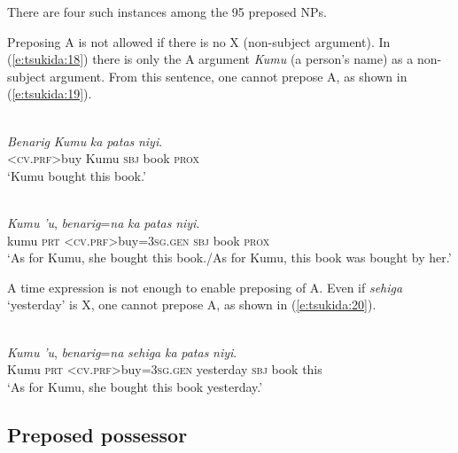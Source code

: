 \documentclass[output=paper
,modfonts
,nonflat]{langsci/langscibook}
\begin{document}
\noindent
There are four such instances among the 95 preposed NPs.

Preposing A is not allowed if there is no X (non-subject argument). In (\ref{e:tsukida:18}) there is only the A argument \textit{Kumu} (a person’s name) as a non-subject argument. From this sentence, one cannot prepose A, as shown in (\ref{e:tsukida:19}).

\begin{exe}
	\label{e:tsukida:18}\\
	\gll \textit{B}{\USSmaller}\textit{en}{\USGreater}\textit{arig} \textit{Kumu} \textit{ka} \textit{patas} \textit{niyi}.\\
	<\textsc{cv.prf}>buy  Kumu  \textsc{sbj} book \textsc{prox} \\
	\glt ‘Kumu bought this book.’
\end{exe}

\begin{exe}
	\label{e:tsukida:19}\\
	\gll {\USStar}\textit{Kumu} \textit{'u},  \textit{b}{\USSmaller}\textit{en}{\USGreater}\textit{arig}=\textit{na} \textit{ka}    \textit{patas}   \textit{niyi}.\\
	\phantom{*}kumu  \textsc{prt} <\textsc{cv.prf}>buy=\textsc{3sg.gen} \textsc{sbj} book \textsc{prox}\\
	\glt ‘As for Kumu, she bought this book./As for Kumu, this book was bought by her.’
\end{exe}

\noindent
A time expression is not enough to enable preposing of A. Even if \textit{sehiga} ‘yesterday’ is X, one cannot prepose A, as shown in (\ref{e:tsukida:20}).

\begin{exe}
	\label{e:tsukida:20}\\
	\gll {\USStar}\textit{Kumu} \textit{'u}, \textit{b}{\USSmaller}\textit{en}{\USGreater}\textit{arig}=\textit{na} \textit{sehiga}  \textit{ka} \textit{patas} \textit{niyi}.\\
	\phantom{*}Kumu  \textsc{prt} <\textsc{cv.prf}>buy=\textsc{3sg.gen} yesterday \textsc{sbj} book  this\\
	\glt ‘As for Kumu, she bought this book yesterday.’
\end{exe}

\subsection{\label{s:tsukida:2.3}Preposed possessor}
\end{document}
